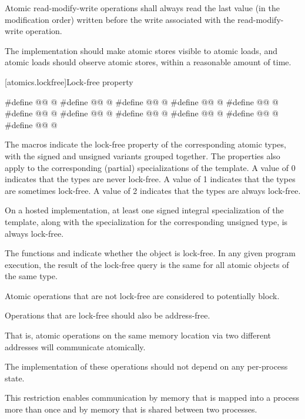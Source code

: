\pnum
Atomic read-modify-write operations shall always read the last value
(in the modification order) written before the write associated with
the read-modify-write operation.

\pnum
\recommended
The implementation should make atomic stores visible to atomic loads,
and atomic loads should observe atomic stores,
within a reasonable amount of time.

[atomics.lockfree]{Lock-free property}

\begin{codeblock}
#define @@ @\unspec@
#define @@ @\unspec@
#define @@ @\unspec@
#define @@ @\unspec@
#define @@ @\unspec@
#define @@ @\unspec@
#define @@ @\unspec@
#define @@ @\unspec@
#define @@ @\unspec@
#define @@ @\unspec@
#define @@ @\unspec@
\end{codeblock}

\pnum
The  macros indicate the lock-free property of the
corresponding atomic types, with the signed and unsigned variants grouped
together. The properties also apply to the corresponding (partial) specializations of the
 template. A value of 0 indicates that the types are never
lock-free. A value of 1 indicates that the types are sometimes lock-free. A
value of 2 indicates that the types are always lock-free.

\pnum
On a hosted implementation,
at least one signed integral specialization of the  template,
along with the specialization
for the corresponding unsigned type,
is always lock-free.

\pnum
The functions  and
indicate whether the object is lock-free. In any given program execution, the
result of the lock-free query
is the same for all atomic objects of the same type.

\pnum
Atomic operations that are not lock-free are considered to potentially
block.

\pnum
\recommended
Operations that are lock-free should also be address-free.
\begin{footnote}
That is,
atomic operations on the same memory location via two different addresses will
communicate atomically.
\end{footnote}
The implementation of these operations should not depend on any per-process state.
\begin{note}
This restriction enables communication by memory that is
mapped into a process more than once and by memory that is shared between two
processes.
\end{note}

